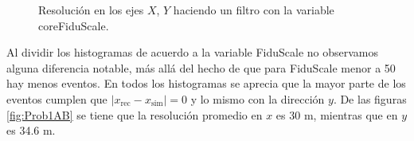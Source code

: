 \documentclass[11pt]{article}
\begin{document}
\begin{figure}[H]
\centering
{}

\caption{Resolución en los ejes $X$, $Y$ haciendo un filtro con la variable coreFiduScale.}
\label{fig:Prob1CD}
\end{figure}

Al dividir los histogramas de acuerdo a la variable FiduScale no observamos alguna diferencia notable, más allá del hecho de que para FiduScale menor a 50 hay menos eventos. En todos los histogramas se aprecia que la mayor parte de los eventos cumplen que $|x_{\textrm	{rec}} -x_{\textrm{sim}}|=0$ y lo mismo con la dirección $y$. De las figuras \ref{fig:Prob1AB} se tiene que la resolución promedio en $x$ es $30$ m, mientras que en $y$ es 34.6 m.
\end{document}
